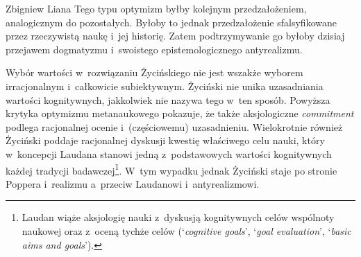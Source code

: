 \begin{artplenv}{Zbigniew Liana}
Tego typu optymizm byłby kolejnym przedzałożeniem, analogicznym do pozostałych. Byłoby to jednak przedzałożenie sfalsyfikowane przez rzeczywistą naukę i~jej historię. Zatem podtrzymywanie go byłoby dzisiaj przejawem dogmatyzmu i~swoistego epistemologicznego antyrealizmu.

Wybór wartości w~rozwiązaniu Życińskiego nie jest wszakże wyborem irracjonalnym i~całkowicie subiektywnym. Życiński nie unika uzasadniania wartości kognitywnych, jakkolwiek nie nazywa tego w~ten sposób. Powyższa krytyka optymizmu metanaukowego pokazuje, że także aksjologiczne \textit{commitment} podlega racjonalnej ocenie i~(częściowemu) uzasadnieniu. Wielokrotnie również Życiński poddaje racjonalnej dyskusji kwestię właściwego celu nauki, który w~koncepcji Laudana stanowi jedną z~podstawowych wartości kognitywnych każdej tradycji badawczej\footnote{Laudan
\parencite*[][s.~44n]{laudan_science_1984} %
 wiąże aksjologię nauki z~dyskusją kognitywnych celów wspólnoty naukowej oraz z~oceną tychże celów (‘\textit{cognitive goals}', ‘\textit{goal evaluation}', ‘\textit{basic aims and goals}').}. W~tym wypadku jednak Życiński staje po stronie Poppera i~realizmu a~przeciw Laudanowi i~antyrealizmowi.


\end{artplenv}
